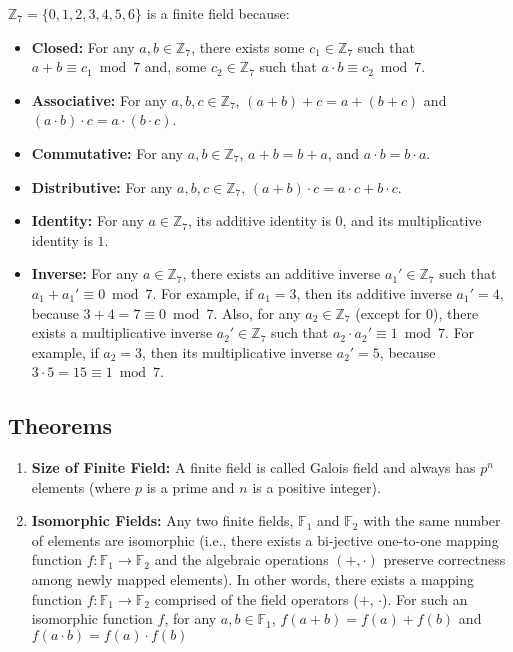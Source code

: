 \noindent $\mathbb{Z}_7 = \{0, 1, 2, 3, 4, 5, 6\}$ is a finite field because:
\begin{itemize}
\item \textbf{Closed:} For any $a, b \in \mathbb{Z}_7$, there exists some $c_1 \in \mathbb{Z}_7$ such that $a + b \equiv c_1 \bmod 7$ and, some $c_2 \in \mathbb{Z}_7$ such that $a \cdot b \equiv c_2 \bmod 7$.
\item \textbf{Associative:} For any $a, b, c \in \mathbb{Z}_7$, $ (a + b) + c = a + (b + c)$ and $(a \cdot b) \cdot c = a \cdot (b \cdot c)$.
\item \textbf{Commutative:} For any $a, b \in \mathbb{Z}_7$, $ a + b = b + a$, and $a \cdot b = b \cdot a$.
\item \textbf{Distributive:} For any $a, b, c \in \mathbb{Z}_7$, $ (a + b) \cdot c = a \cdot c + b \cdot c$.
\item \textbf{Identity:} For any $a \in \mathbb{Z}_7$, its additive identity is $0$, and its multiplicative identity is $1$.
\item \textbf{Inverse:} For any $a \in \mathbb{Z}_7$, there exists an additive inverse $a_1' \in \mathbb{Z}_7$ such that $a_1 + a_1' \equiv 0 \bmod 7$. For example, if $a_1 = 3$, then its additive inverse $a_1' = 4$, because $3 + 4 = 7 \equiv 0 \bmod 7$. Also, for any $a_2 \in \mathbb{Z}_7$ (except for 0), there exists a multiplicative inverse $a_2' \in \mathbb{Z}_7$ such that $a_2 \cdot a_2' \equiv 1 \bmod 7$. For example, if $a_2 = 3$, then its multiplicative inverse $a_2' = 5$, because $3 \cdot 5 = 15 \equiv 1 \bmod 7$. 
\end{itemize}

\subsection{Theorems}
\label{subsec:field-theorem}

\begin{tcolorbox}[title={\textbf{\tboxtheorem{\ref*{subsec:field-theorem}} Field Theorems}}]
\begin{enumerate}
\item \textbf{Size of Finite Field:} A finite field is called Galois field and always has $p^n$ elements (where $p$ is a prime and $n$ is a positive integer).
\item \textbf{Isomorphic Fields:} Any two finite fields, $\mathbb{F}_1$ and $\mathbb{F}_2$ with the same number of elements are isomorphic (i.e., there exists a bi-jective one-to-one mapping function $f : \mathbb{F}_1 \rightarrow \mathbb{F}_2$ and the algebraic operations $(+, \cdot)$ preserve correctness among newly mapped elements). In other words, there exists a mapping function $f : \mathbb{F}_1 \rightarrow \mathbb{F}_2$ comprised of the field operators ($+$, $\cdot$). For such an isomorphic function $f$, for any $a, b \in \mathbb{F}_1$, $f(a+b) = f(a) + f(b)$ and $f(a \cdot b) = f(a) \cdot f(b)$
\end{enumerate}
\end{tcolorbox}
